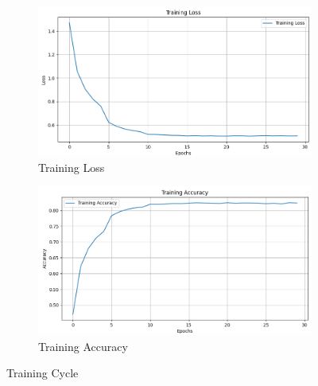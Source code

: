 \documentclass[11pt,en]{elegantpaper}
\begin{document}
\begin{figure}[htbp]
  \centering
\begin{subfigure}[b]{0.49\textwidth}
  \centering
  \includegraphics[width=\textwidth]{fig/Training_Loss.png}
  \caption{Training Loss}
\end{subfigure}
\hfill
\begin{subfigure}[b]{0.49\textwidth}
  \centering
  \includegraphics[width=\textwidth]{fig/Training_Accuracy.png}
  \caption{Training Accuracy}
\end{subfigure}

\caption{Training Cycle}
\end{figure}



\end{document}

